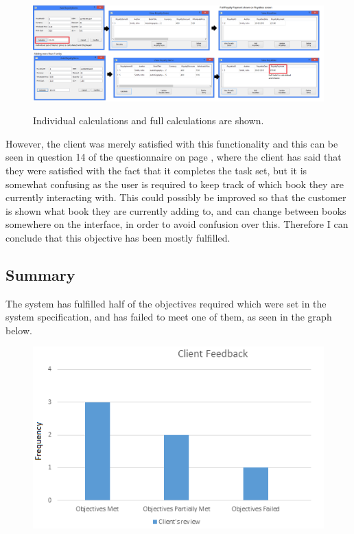 \begin{figure}[H]
    \includegraphics[width=\textwidth]{./Evaluation/Evidence/CalculateRoyalties.png}
    \label{fig:CalculateRoyalties} \caption{Individual calculations and full calculations are shown.}
\end{figure}

However, the client was merely satisfied with this functionality and this can be seen in question 14 of the questionnaire on page \pageref{fig:QuestionnairePage2}, where the client has said that they were satisfied with the fact that it completes the task set, but it is somewhat confusing as the user is required to keep track of which book they are currently interacting with. This could possibly be improved so that the customer is shown what book they are currently adding to, and can change between books somewhere on the interface, in order to avoid confusion over this. Therefore I can conclude that this objective has been mostly fulfilled.

\subsection{Summary}

The system has fulfilled half of the objectives required which were set in the system specification, and has failed to meet one of them, as seen in the graph below.

\begin{figure}[H]
    \includegraphics[width=\textwidth]{./Evaluation/ClientFeedback.png}
    \label{fig:ClientFeedback}
\end{figure}

